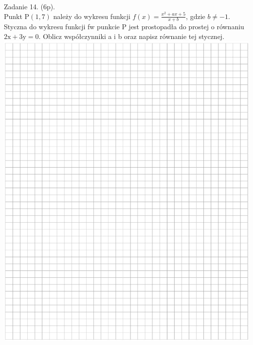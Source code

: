 \documentclass[10pt]{article}
\begin{document}
Zadanie 14. (6p).\\
Punkt \(\mathrm{P}(1,7)\) należy do wykresu funkcji \(f(x)=\frac{x^{2}+a x+5}{x+b}\), gdzie \(b \neq-1\).\\
Styczna do wykresu funkcji fw punkcie P jest prostopadła do prostej o równaniu \(2 \mathrm{x}+3 \mathrm{y}=0\). Oblicz współczynniki a i b oraz napisz równanie tej stycznej.\\
\includegraphics[max width=\textwidth, center]{2024_11_21_498389c978c770348ebcg-12}
\end{document}
